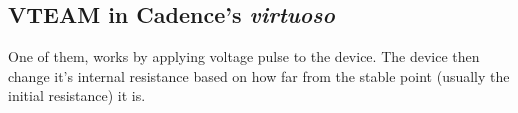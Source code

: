     \subsection{\ac{VTEAM} in \textbf{Cadence}'s \textit{virtuoso}}


    One of them, works by applying voltage pulse to the device. The device then change it's internal resistance based on how far from the stable point (usually the initial resistance) it is.


